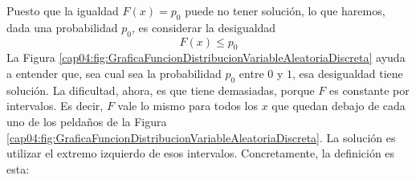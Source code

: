 Puesto que la igualdad $F(x)=p_0$ puede no tener solución, lo que haremos, dada una probabilidad  $p_0$, es considerar la desigualdad
\[F(x)\leq p_0\]
La Figura \ref{cap04:fig:GraficaFuncionDistribucionVariableAleatoriaDiscreta} ayuda a entender que, sea cual sea la probabilidad $p_0$ entre $0$ y $1$, esa desigualdad tiene solución. La dificultad, ahora, es que tiene demasiadas, porque $F$ es constante por intervalos. Es decir, $F$ vale lo mismo para todos los $x$ que quedan debajo de cada uno de los peldaños de la Figura \ref{cap04:fig:GraficaFuncionDistribucionVariableAleatoriaDiscreta}. La solución es utilizar el extremo izquierdo de esos intervalos. Concretamente, la definición es esta:
    \begin{center}
    \end{center}

